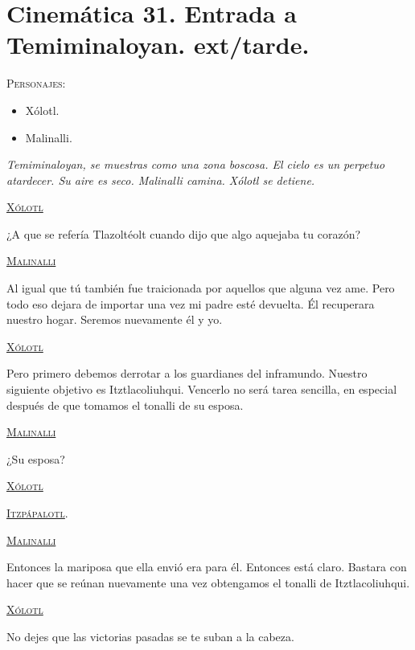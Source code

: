 \section{Cinemática 31. Entrada a Temiminaloyan. ext/tarde.} \label{Cin:Cinematica31}
 \textsc{Personajes}:
 \begin{itemize}
 \item Xólotl.
\item Malinalli.
 \end{itemize}
\textit{Temiminaloyan, se muestras como una zona boscosa. El cielo es un perpetuo atardecer. Su aire es seco. Malinalli camina. Xólotl se detiene.}
\begin{center}
\textsc{\underline{Xólotl}}
\\
\par
¿A que se refería Tlazoltéolt cuando dijo que algo aquejaba tu corazón?
\\
\par
\textsc{\underline{Malinalli}}
\\
\par
Al igual que tú también fue traicionada por aquellos que alguna vez ame. Pero todo eso dejara de importar una vez mi padre esté devuelta. Él recuperara nuestro hogar. Seremos nuevamente él y yo.
\\
\par
\textsc{\underline{Xólotl}}
\\
\par
Pero primero debemos derrotar a los guardianes del inframundo. Nuestro siguiente objetivo es Itztlacoliuhqui. Vencerlo no será tarea sencilla, en especial después de que tomamos el tonalli de su esposa.
\\
\par
\textsc{\underline{Malinalli}}
\\
\par
¿Su esposa?
\\
\par
\textsc{\underline{Xólotl}}
\\
\par
\textsc{\underline{Itzpápalotl}}.
\\
\par
\textsc{\underline{Malinalli}}
\\
\par
Entonces la mariposa que ella envió era para él. Entonces está claro. Bastara con hacer que se reúnan nuevamente una vez obtengamos el tonalli de Itztlacoliuhqui.
\\
\par
\textsc{\underline{Xólotl}}
\\
\par
No dejes que las victorias pasadas se te suban a la cabeza.
\end{center}